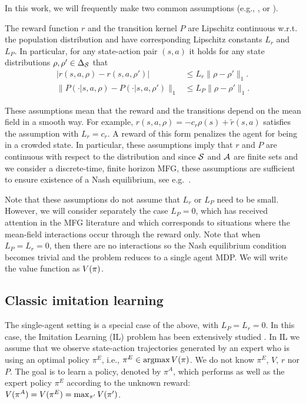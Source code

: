 \documentclass{article}
\begin{document}
In this work,  we will frequently make two common assumptions (e.g., \cite[Asm.~1]{anahtarci2023q}, or \cite[Asm.~1]{yardim2022policy}).
\begin{assumption}
\label{asm:lipschitz}
The reward function $r$ and the transition kernel $P$ are Lipschitz continuous w.r.t. the population distribution and have corresponding Lipschitz constants $L_r$ and $L_P$. 
In particular, for any state-action pair $(s,a)$ it holds for any state distributions $\rho,\rho' \in \Delta_{\mathcal{S}}$ that
\begin{align}
|r(s,a,\rho) - r(s,a,\rho')| &\leq L_r \|\rho - \rho'\|_1.
\\
 \|P(\cdot|s,a,\rho) - P(\cdot|s,a,\rho')\|_1 &\leq L_P\|\rho - \rho'\|_1.
\end{align}
\end{assumption}
These assumptions mean that the reward and the transitions depend on the mean field in a smooth way. For example, $r(s,a,\rho) = - c_r \rho(s) + \tilde{r}(s,a)$ satisfies the assumption with $L_r = c_r$. 
A reward of this form penalizes the agent for being in a crowded state. 
In particular, these assumptions imply that $r$ and $P$ are continuous with respect to the distribution and since $\mathcal{S}$ and $\mathcal{A}$ are finite sets and we consider a discrete-time, finite horizon MFG, these assumptions are sufficient to ensure existence of a Nash equilibrium, see e.g.~\cite[Proposition 1]{cui2021approximately}.

Note that these assumptions do not assume that $L_r$ or $L_P$ need to be small. However, we will consider separately the case $L_P = 0$, which has received attention in the MFG literature and which corresponds to situations where the mean-field interactions occur through the reward only. 
Note that when $L_P=L_r=0$, then there are no interactions so the Nash equilibrium condition becomes trivial and the problem reduces to a single agent MDP. We will write the value function as $V(\pi)$.

\subsection{Classic imitation learning}\label{sec:classic-IL}

The single-agent setting is a special case of the above, with $L_P=L_r=0$. In this case, the Imitation Learning (IL) problem has been extensively studied \cite{osa2018algorithmic}.  
In IL we assume that we observe state-action trajectories generated by an expert who is using an optimal policy $\pi^E$, i.e., $\pi^E \in \operatorname*{argmax} V(\pi)$. 
We do not know $\pi^E$, $V$, $r$ nor $P$. The goal is to learn a policy, denoted by $\pi^A$, which performs as well as the expert policy $\pi^E$ according to the unknown reward: $V(\pi^A) = V(\pi^E) = \max_{\pi'}V(\pi^{\prime})$.
\end{document}
